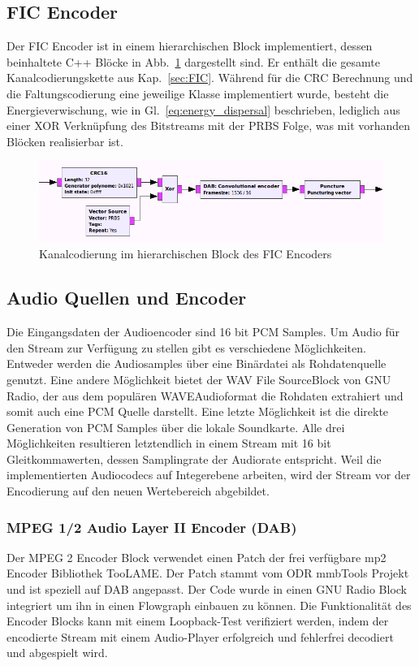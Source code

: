 \subsection{FIC Encoder}
\label{sec:fic_encoder}
Der FIC Encoder ist in einem hierarchischen Block implementiert, dessen beinhaltete C++ Blöcke in Abb.~\ref{fig:fic_encoder} dargestellt sind. Er enthält die gesamte Kanalcodierungskette aus Kap.~\ref{sec:FIC}. Während für die CRC Berechnung und die Faltungscodierung eine jeweilige Klasse implementiert wurde, besteht die Energieverwischung, wie in Gl.~\ref{eq:energy_dispersal} beschrieben, lediglich aus einer XOR Verknüpfung des Bitstreams mit der PRBS Folge, was mit vorhanden Blöcken realisierbar ist.

\begin{figure}[ht]
\centering
  \includegraphics[width=\textwidth]{figures/FIC_encoder.png}
	\caption{Kanalcodierung im hierarchischen Block des FIC Encoders}
	\label{fig:fic_encoder}
\end{figure}

\subsection{Audio Quellen und Encoder}
Die Eingangsdaten der Audioencoder sind 16 bit \ac{PCM} Samples. Um Audio für den Stream zur Verfügung zu stellen gibt es verschiedene Möglichkeiten. Entweder werden die Audiosamples über eine Binärdatei als Rohdatenquelle genutzt. Eine andere Möglichkeit bietet der \dq WAV File Source\dq Block von GNU Radio, der aus dem populären \dq WAVE\dq Audioformat die Rohdaten extrahiert und somit auch eine PCM Quelle darstellt. Eine letzte Möglichkeit ist die direkte Generation von PCM Samples über die lokale Soundkarte. Alle drei Möglichkeiten resultieren letztendlich in einem Stream mit 16 bit Gleitkommawerten, dessen Samplingrate der Audiorate entspricht. Weil die implementierten Audiocodecs auf Integerebene arbeiten, wird der Stream vor der Encodierung auf den neuen Wertebereich abgebildet.

\subsubsection{MPEG 1/2 Audio Layer II Encoder (DAB)}
Der MPEG 2 Encoder Block verwendet einen Patch der frei verfügbare mp2 Encoder Bibliothek TooLAME. Der Patch stammt vom ODR mmbTools Projekt \cite{repo:odr_audioenc} und ist speziell auf DAB angepasst. Der Code wurde in einen GNU Radio Block integriert um ihn in einen Flowgraph einbauen zu können. Die Funktionalität des Encoder Blocks kann mit einem Loopback-Test verifiziert werden, indem der encodierte Stream mit einem Audio-Player erfolgreich und fehlerfrei decodiert und abgespielt wird.

